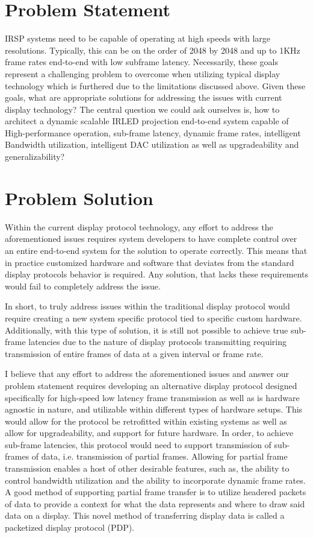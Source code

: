 \section{Problem Statement}
    IRSP systems need to be capable of operating at high speeds with large resolutions. Typically, this can be on the order of 2048 by 2048 and up to 1KHz frame rates end-to-end with low subframe latency. Necessarily, these goals represent a challenging problem to overcome when utilizing typical display technology which is furthered due to the limitations discussed above. Given these goals, what are appropriate solutions for addressing the issues with current display technology? The central question we could ask ourselves is, how to architect a dynamic scalable IRLED projection end-to-end system capable of High-performance operation, sub-frame latency, dynamic frame rates, intelligent Bandwidth utilization, intelligent DAC utilization as well as upgradeability and generalizability?

\section{Problem Solution}
    Within the current display protocol technology, any effort to address the aforementioned issues requires system developers to have complete control over an entire end-to-end system for the solution to operate correctly. This means that in practice customized hardware and software that deviates from the standard display protocols behavior is required. Any solution, that lacks these requirements would fail to completely address the issue.

    In short, to truly address issues within the traditional display protocol would require creating a new system specific protocol tied to specific custom hardware. Additionally, with this type of solution, it is still not possible to achieve true sub-frame latencies due to the nature of display protocols transmitting requiring transmission of entire frames of data at a given interval or frame rate.

    I believe that any effort to address the aforementioned issues and answer our problem statement requires developing an alternative display protocol designed specifically for high-speed low latency frame transmission as well as is hardware agnostic in nature, and utilizable within different types of hardware setups. This would allow for the protocol be retrofitted within existing systems as well as allow for upgradeability, and support for future hardware. In order, to achieve sub-frame latencies, this protocol would need to support transmission of sub-frames of data, i.e. transmission of partial frames. Allowing for partial frame transmission enables a host of other desirable features, such as, the ability to control bandwidth utilization and the ability to incorporate dynamic frame rates. A good method of supporting partial frame transfer is to utilize headered packets of data to provide a context for what the data represents and where to draw said data on a display. This novel method of transferring display data is called a packetized display protocol (PDP).


